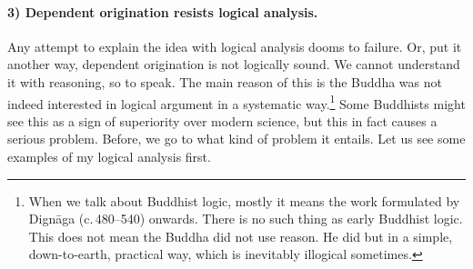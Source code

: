 \paragraph*{3) Dependent origination resists logical analysis.} Any attempt to explain the idea with logical analysis dooms to failure. Or, put it another way, dependent origination is not logically sound. We cannot understand it with reasoning, so to speak. The main reason of this is the Buddha was not indeed interested in logical argument in a systematic way.\footnote{When we talk about Buddhist logic, mostly it means the work formulated by Dign\=aga (c.\,480--540) onwards. There is no such thing as early Buddhist logic. This does not mean the Buddha did not use reason. He did but in a simple, down-to-earth, practical way, which is inevitably illogical sometimes.} Some Buddhists might see this as a sign of superiority over modern science, but this in fact causes a serious problem. Before, we go to what kind of problem it entails. Let us see some examples of my logical analysis first.

